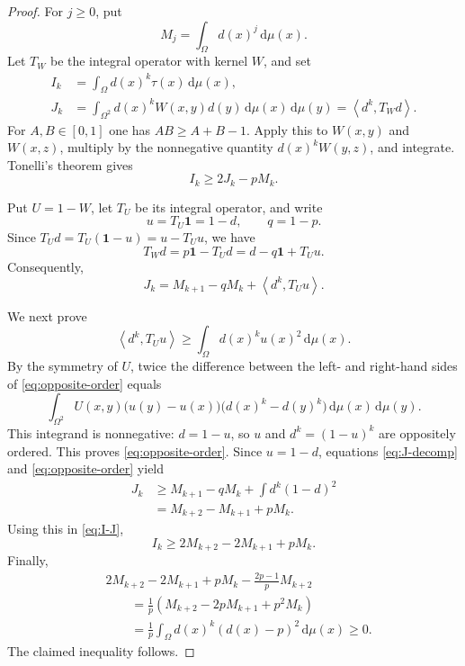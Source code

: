 \documentclass[11pt]{article}
\newcommand{\dd}{\,\mathrm{d}}
\newcommand{\one}{\mathbf{1}}
\newcommand{\ip}[2]{\left\langle #1,#2\right\rangle}
\begin{document}
\begin{proof}
For $j\geq0$, put
\[
M_j=\int_\Omega d(x)^j\dd\mu(x).
\]
Let $T_W$ be the integral operator with kernel $W$, and set
\begin{align*}
I_k&=\int_\Omega d(x)^k\tau(x)\dd\mu(x),\\
J_k&=\int_{\Omega^2}d(x)^kW(x,y)d(y)
\dd\mu(x)\dd\mu(y)
=\ip{d^k}{T_Wd}.
\end{align*}
For $A,B\in[0,1]$ one has $AB\geq A+B-1$.  Apply this to
$W(x,y)$ and $W(x,z)$, multiply by the nonnegative quantity
$d(x)^kW(y,z)$, and integrate.  Tonelli's theorem gives
\begin{equation}
I_k\geq 2J_k-pM_k.
\label{eq:I-J}
\end{equation}

Put $U=1-W$, let $T_U$ be its integral operator, and write
\[
u=T_U\one=1-d,
\qquad q=1-p.
\]
Since $T_Ud=T_U(\one-u)=u-T_Uu$, we have
\[
T_Wd
=p\one-T_Ud
=d-q\one+T_Uu.
\]
Consequently,
\begin{equation}
J_k=M_{k+1}-qM_k+\ip{d^k}{T_Uu}.
\label{eq:J-decomp}
\end{equation}

We next prove
\begin{equation}
\ip{d^k}{T_Uu}
\geq
\int_\Omega d(x)^ku(x)^2\dd\mu(x).
\label{eq:opposite-order}
\end{equation}
By the symmetry of $U$, twice the difference between the left- and
right-hand sides of \eqref{eq:opposite-order} equals
\[
\int_{\Omega^2}
U(x,y)
\bigl(u(y)-u(x)\bigr)
\bigl(d(x)^k-d(y)^k\bigr)
\dd\mu(x)\dd\mu(y).
\]
This integrand is nonnegative: $d=1-u$, so $u$ and
$d^k=(1-u)^k$ are oppositely ordered.  This proves
\eqref{eq:opposite-order}.  Since $u=1-d$, equations
\eqref{eq:J-decomp} and \eqref{eq:opposite-order} yield
\begin{align*}
J_k
&\geq
M_{k+1}-qM_k
+\int d^k(1-d)^2
\\
&=
M_{k+2}-M_{k+1}+pM_k.
\end{align*}
Using this in \eqref{eq:I-J},
\[
I_k\geq 2M_{k+2}-2M_{k+1}+pM_k.
\]
Finally,
\begin{align*}
&2M_{k+2}-2M_{k+1}+pM_k
-\frac{2p-1}{p}M_{k+2}
\\
&\qquad=
\frac1p
\left(M_{k+2}-2pM_{k+1}+p^2M_k\right)
\\
&\qquad=
\frac1p\int_\Omega d(x)^k(d(x)-p)^2\dd\mu(x)
\geq0.
\end{align*}
The claimed inequality follows.
\end{proof}


\end{document}
